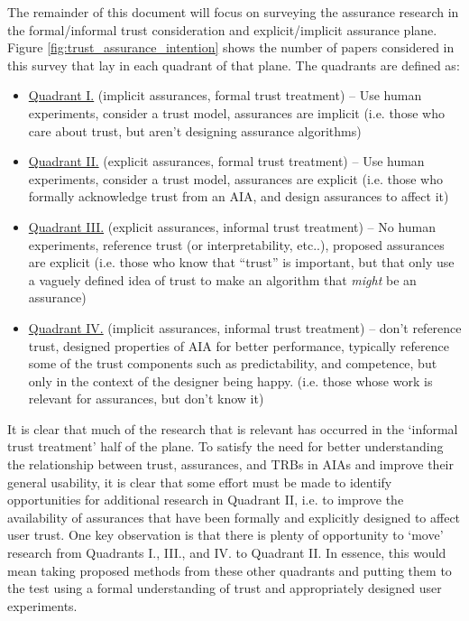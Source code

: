 The remainder of this document will focus on surveying the assurance research in the formal/informal trust consideration and explicit/implicit assurance plane. Figure \ref{fig:trust_assurance_intention} shows the number of papers considered in this survey that lay in each quadrant of that plane. The quadrants are defined as:

\begin{itemize}
    \item \hyperref[sec:q1]{Quadrant I.} (implicit assurances, formal trust treatment) -- Use human experiments, consider a trust model, assurances are implicit (i.e. those who care about trust, but aren't designing assurance algorithms)
    \item \hyperref[sec:q2]{Quadrant II.} (explicit assurances, formal trust treatment) -- Use human experiments, consider a trust model, assurances are explicit (i.e. those who formally acknowledge trust from an AIA, and design assurances to affect it)
    \item \hyperref[sec:q3]{Quadrant III.} (explicit assurances, informal trust treatment) -- No human experiments, reference trust (or interpretability, etc..), proposed assurances are explicit (i.e. those who know that ``trust'' is important, but that only use a vaguely defined idea of trust to make an algorithm that \emph{might} be an assurance)
    \item \hyperref[sec:q4]{Quadrant IV.} (implicit assurances, informal trust treatment) -- don't reference trust, designed properties of AIA for better performance, typically reference some of the trust components such as predictability, and competence, but only in the context of the designer being happy. (i.e. those whose work is relevant for assurances, but don't know it)
\end{itemize}

It is clear that much of the research that is relevant has occurred in the `informal trust treatment' half of the plane. To satisfy the need for better understanding the relationship between trust, assurances, and TRBs in AIAs and improve their general usability, it is clear that some effort must be made to identify opportunities for additional research in Quadrant II, i.e. to improve the availability of assurances that have been formally and explicitly designed to affect user trust. One key observation is that there is plenty of opportunity to `move' research from Quadrants I., III., and IV. to Quadrant II. In essence, this would mean taking proposed methods from these other quadrants and putting them to the test using a formal understanding of trust and appropriately designed user experiments.





